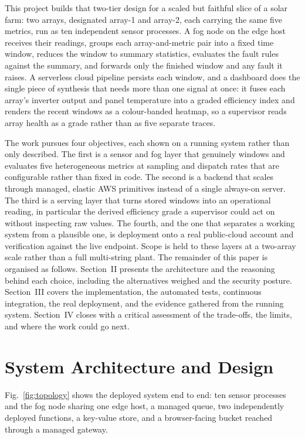 \documentclass[conference]{IEEEtran}
\begin{document}
This project builds that two-tier design for a scaled but faithful slice of a solar farm: two arrays, designated array-1 and array-2, each carrying the same five metrics, run as ten independent sensor processes. A fog node on the edge host receives their readings, groups each array-and-metric pair into a fixed time window, reduces the window to summary statistics, evaluates the fault rules against the summary, and forwards only the finished window and any fault it raises. A serverless cloud pipeline persists each window, and a dashboard does the single piece of synthesis that needs more than one signal at once: it fuses each array's inverter output and panel temperature into a graded efficiency index and renders the recent windows as a colour-banded heatmap, so a supervisor reads array health as a grade rather than as five separate traces.

The work pursues four objectives, each shown on a running system rather than only described. The first is a sensor and fog layer that genuinely windows and evaluates five heterogeneous metrics at sampling and dispatch rates that are configurable rather than fixed in code. The second is a backend that scales through managed, elastic AWS primitives instead of a single always-on server. The third is a serving layer that turns stored windows into an operational reading, in particular the derived efficiency grade a supervisor could act on without inspecting raw values. The fourth, and the one that separates a working system from a plausible one, is deployment onto a real public-cloud account and verification against the live endpoint. Scope is held to these layers at a two-array scale rather than a full multi-string plant. The remainder of this paper is organised as follows. Section~II presents the architecture and the reasoning behind each choice, including the alternatives weighed and the security posture. Section~III covers the implementation, the automated tests, continuous integration, the real deployment, and the evidence gathered from the running system. Section~IV closes with a critical assessment of the trade-offs, the limits, and where the work could go next.

\section{System Architecture and Design}

Fig.~\ref{fig:topology} shows the deployed system end to end: ten sensor processes and the fog node sharing one edge host, a managed queue, two independently deployed functions, a key-value store, and a browser-facing bucket reached through a managed gateway.
\end{document}
